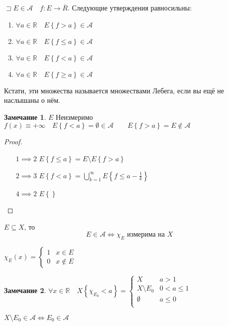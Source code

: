 \documentclass{book}
\newcommand\R{\ensuremath{\mathbb{R}}}
\renewcommand\O{\ensuremath{\emptyset}}
\theoremstyle{definition}
\newtheorem*{note}{Замечание}
\begin{document}
\begin{statement}
    $\sqsupset E\in \mathcal A\quad f: E \to \overline R$. Следующие утверждения равносильны:
    \begin{enumerate}
        \item $\forall a\in \R\quad E\left\{ f > a \right\} \in \mathcal A$
        \item $\forall a\in \R\quad E\left\{ f \leqslant  a \right\} \in \mathcal A$
        \item $\forall a\in \R\quad E\left\{ f < a \right\} \in \mathcal A$
        \item $\forall a\in \R\quad E\left\{ f \geqslant  a \right\} \in \mathcal A$
    \end{enumerate}

    Кстати, эти множества называется множествами Лебега, если вы ещё не наслышаны о нём.
\end{statement}
\begin{note}
    $E$ Неизмеримо  $f(x) \equiv +\infty \quad E\left\{ f<a \right\}  = \O \in \mathcal A\qquad E\left\{ f>a \right\}  = E\not\in \mathcal A$
\end{note}
\begin{proof}
    \begin{itemize}
        \item []
        \item [$1\implies 2$] $E\left\{ f\leqslant a \right\}  = E \setminus E\left\{ f>a \right\} $
        \item [$2\implies 3$] $E\left\{ f<a \right\} = \bigcup\limits_{k=1}^{\infty }E\left\{ f\leqslant a - \frac{1}{k} \right\}  $ 
        \item [$4\implies 2$] $E\left\{  \right\} $
    \end{itemize}
\end{proof}

\begin{statement}
    $E\subseteq X$, то \[E\in \mathcal A \iff \chi_E \text{ измерима на } X\]

    $\chi_E(x) = \begin{cases}
        1&x\in E\\
        0&x\not\in E
    \end{cases}$
\end{statement}

\begin{note}
    $\forall x\in \R\quad X\left\{ \chi_{E_0}<a \right\}  = \begin{cases}
        X&a>1\\
        X\setminus E_0&0<a\leqslant 1\\
        \O &a\leqslant 0\\ 
    \end{cases}$

    $X\setminus E_0\in\mathcal A \iff E_0\in\mathcal A$
\end{note}
\end{document}
